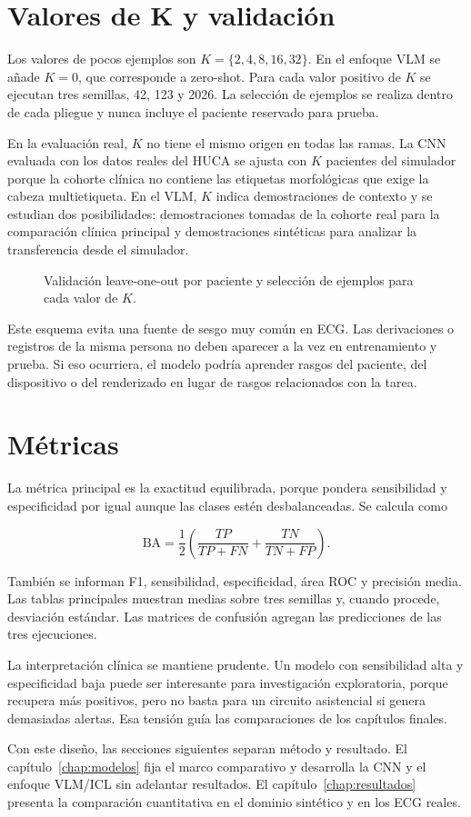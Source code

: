 \section{Valores de K y validación}

Los valores de pocos ejemplos son \(K=\{2,4,8,16,32\}\). En el enfoque VLM se añade \(K=0\), que corresponde a zero-shot. Para cada valor positivo de \(K\) se ejecutan tres semillas, 42, 123 y 2026. La selección de ejemplos se realiza dentro de cada pliegue y nunca incluye el paciente reservado para prueba.

En la evaluación real, \(K\) no tiene el mismo origen en todas las ramas. La CNN evaluada con los datos reales del HUCA se ajusta con \(K\) pacientes del simulador porque la cohorte clínica no contiene las etiquetas morfológicas que exige la cabeza multietiqueta. En el VLM, \(K\) indica demostraciones de contexto y se estudian dos posibilidades: demostraciones tomadas de la cohorte real para la comparación clínica principal y demostraciones sintéticas para analizar la transferencia desde el simulador.

\begin{figure}[H]
  \centering
  \caption{Validación leave-one-out por paciente y selección de ejemplos para cada valor de \(K\).}
  \label{fig:k_examples_split}
\end{figure}

Este esquema evita una fuente de sesgo muy común en ECG. Las derivaciones o registros de la misma persona no deben aparecer a la vez en entrenamiento y prueba. Si eso ocurriera, el modelo podría aprender rasgos del paciente, del dispositivo o del renderizado en lugar de rasgos relacionados con la tarea.

\section{Métricas}

La métrica principal es la exactitud equilibrada, porque pondera sensibilidad y especificidad por igual aunque las clases estén desbalanceadas. Se calcula como

\[
  \mathrm{BA}=\frac{1}{2}\left(\frac{TP}{TP+FN}+\frac{TN}{TN+FP}\right).
\]

También se informan F1, sensibilidad, especificidad, área ROC y precisión media. Las tablas principales muestran medias sobre tres semillas y, cuando procede, desviación estándar. Las matrices de confusión agregan las predicciones de las tres ejecuciones.

La interpretación clínica se mantiene prudente. Un modelo con sensibilidad alta y especificidad baja puede ser interesante para investigación exploratoria, porque recupera más positivos, pero no basta para un circuito asistencial si genera demasiadas alertas. Esa tensión guía las comparaciones de los capítulos finales.

Con este diseño, las secciones siguientes separan método y resultado. El capítulo~\ref{chap:modelos} fija el marco comparativo y desarrolla la CNN y el enfoque VLM/ICL sin adelantar resultados. El capítulo~\ref{chap:resultados} presenta la comparación cuantitativa en el dominio sintético y en los ECG reales.
